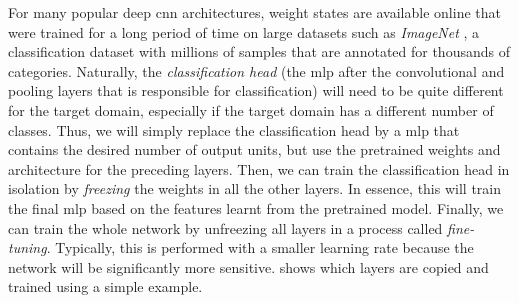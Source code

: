 \documentclass[../report.tex]{subfiles}
\begin{document}
For many popular deep \gls{cnn} architectures, weight states are available online that were trained for a long period of time on large datasets such as \emph{ImageNet} \cite{deng2009}, a classification dataset with millions of samples that are annotated for thousands of categories.
Naturally, the \emph{classification head} (the \gls{mlp} after the convolutional and pooling layers that is responsible for classification) will need to be quite different for the target domain, especially if the target domain has a different number of classes.
Thus, we will simply replace the classification head by a \gls{mlp} that contains the desired number of output units, but use the pretrained weights and architecture for the preceding layers.
Then, we can train the classification head in isolation by \emph{freezing} the weights in all the other layers.
In essence, this will train the final \gls{mlp} based on the features learnt from the pretrained model.
Finally, we can train the whole network by unfreezing all layers in a process called \emph{fine-tuning}.
Typically, this is performed with a smaller learning rate because the network will be significantly more sensitive.
 shows which layers are copied and trained using a simple example.
\end{document}
